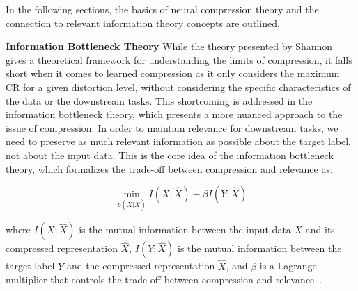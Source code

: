 In the following sections, the basics of neural compression theory and the connection to relevant information theory concepts are outlined.

\textbf{Information Bottleneck Theory} While the theory presented by Shannon~\cite{Shannon1948} gives a theoretical framework for understanding the limits of compression, it falls short when it comes to learned compression as it only considers the maximum CR for a given distortion level, without considering the specific characteristics of the data or the downstream tasks. This shortcoming is addressed in the information bottleneck theory, which presents a more nuanced approach to the issue of compression. In order to maintain relevance for downstream tasks, we need to preserve as much relevant information as possible about the target label, not about the input data. This is the core idea of the information bottleneck theory, which formalizes the trade-off between compression and relevance as: 

\begin{equation}
\min_{p(\hat{X}|X)} I(X;\hat{X}) - \beta I(Y;\hat{X})
\end{equation}

where $I(X;\hat{X})$ is the mutual information between the input data $X$ and its compressed representation $\hat{X}$, $I(Y;\hat{X})$ is the mutual information between the target label $Y$ and the compressed representation $\hat{X}$, and $\beta$ is a Lagrange multiplier that controls the trade-off between compression and relevance~\cite{Tishby2000}. 

